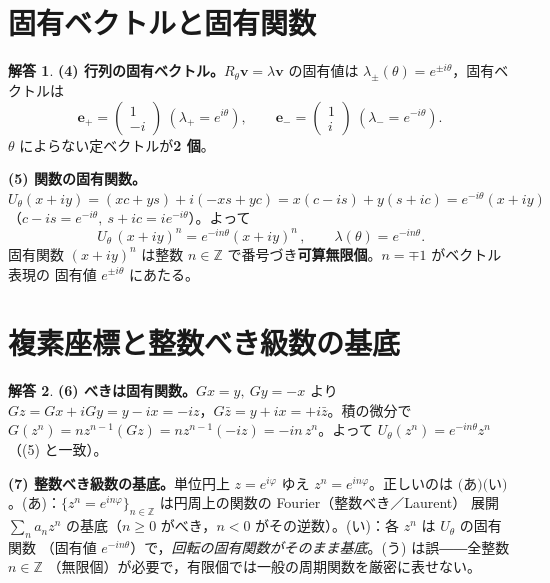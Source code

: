 \documentclass[dvipdfmx, uplatex]{jsarticle}
\theoremstyle{definition}
\newtheorem*{sol}{解答}
\begin{document}
\section{固有ベクトルと固有関数}
\begin{sol}
\textbf{(4) 行列の固有ベクトル。}$R_\theta\bm v=\lambda\bm v$ の固有値は
$\boxed{\lambda_\pm(\theta)=e^{\pm i\theta}}$，固有ベクトルは
\[
    \boxed{\bm e_+=\begin{pmatrix}1\\ -i\end{pmatrix}\ (\lambda_+=e^{i\theta}),\qquad
    \bm e_-=\begin{pmatrix}1\\ i\end{pmatrix}\ (\lambda_-=e^{-i\theta})}.
\]
$\theta$ によらない定ベクトルが\textbf{2 個}。

\par\smallskip
\textbf{(5) 関数の固有関数。}$U_\theta(x+iy)=(xc+ys)+i(-xs+yc)=x(c-is)+y(s+ic)=e^{-i\theta}(x+iy)$
（$c-is=e^{-i\theta},\ s+ic=ie^{-i\theta}$）。よって
\[
    \boxed{\,U_\theta\,(x+iy)^n=e^{-in\theta}(x+iy)^n\,},\qquad \lambda(\theta)=e^{-in\theta}.
\]
固有関数 $(x+iy)^n$ は整数 $n\in\mathbb{Z}$ で番号づき\textbf{可算無限個}。$n=\mp1$ がベクトル表現の
固有値 $e^{\pm i\theta}$ にあたる。
\end{sol}

\section{複素座標と整数べき級数の基底}
\begin{sol}
\textbf{(6) べきは固有関数。}$Gx=y,\ Gy=-x$ より
$Gz=Gx+iGy=y-ix=\boxed{-iz}$，$G\bar z=y+ix=\boxed{+i\bar z}$。積の微分で
$G(z^n)=n z^{n-1}(Gz)=n z^{n-1}(-iz)=\boxed{-in\,z^n}$。よって $U_\theta(z^n)=e^{-in\theta}z^n$
（(5) と一致）。

\par\smallskip
\textbf{(7) 整数べき級数の基底。}単位円上 $z=e^{i\varphi}$ ゆえ $z^n=e^{in\varphi}$。正しいのは
$\boxed{\text{(あ)(い)}}$。(あ)：$\{z^n=e^{in\varphi}\}_{n\in\mathbb{Z}}$ は円周上の関数の Fourier（整数べき／Laurent）
展開 $\sum_n a_n z^n$ の基底（$n\ge0$ がべき，$n<0$ がその逆数）。(い)：各 $z^n$ は $U_\theta$ の固有関数
（固有値 $e^{-in\theta}$）で，\emph{回転の固有関数がそのまま基底}。(う) は誤――全整数 $n\in\mathbb{Z}$
（無限個）が必要で，有限個では一般の周期関数を厳密に表せない。
\end{sol}
\end{document}
